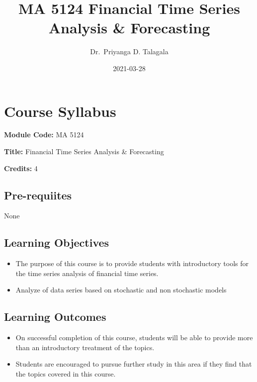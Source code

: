 \documentclass[]{book}
\title{MA 5124 Financial Time Series Analysis \& Forecasting}
\author{Dr.~Priyanga D. Talagala}
\date{2021-03-28}
\providecommand{\tightlist}{%
  \setlength{\itemsep}{0pt}\setlength{\parskip}{0pt}}
\begin{document}
\maketitle

{
\setcounter{tocdepth}{1}
\tableofcontents
}
\hypertarget{course-syllabus}{%
\chapter*{Course Syllabus}\label{course-syllabus}}


\textbf{Module Code:} MA 5124

\textbf{Title:} Financial Time Series Analysis \& Forecasting

\textbf{Credits:} 4

\hypertarget{pre-requiites}{%
\section*{Pre-requiites}\label{pre-requiites}}

None

\hypertarget{learning-objectives}{%
\section*{Learning Objectives}\label{learning-objectives}}

\begin{itemize}
\tightlist
\item
  The purpose of this course is to provide students with introductory tools for the time series analysis of financial time series.
\item
  Analyze of data series based on stochastic and non stochastic models
\end{itemize}

\hypertarget{learning-outcomes}{%
\section*{Learning Outcomes}\label{learning-outcomes}}

\begin{itemize}
\tightlist
\item
  On successful completion of this course, students will be able to provide more than an introductory treatment of the topics.
\item
  Students are encouraged to pursue further study in this area if they find that the topics covered in this course.
\end{itemize}
\end{document}
